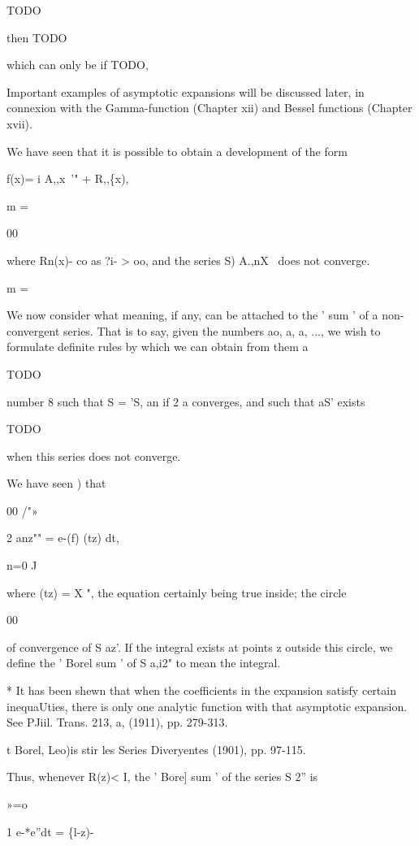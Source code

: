 TODO

then TODO

which can only be if TODO,

Important examples of asymptotic expansions will be discussed later,
in connexion with the Gamma-function (Chapter xii) and Bessel
functions (Chapter xvii).


We have seen that it is possible to obtain a development of the form

f(x)= i A,,x~'" + R,,\{x),

m =

00

where Rn(x)- co as ?i- > oo, and the series S) A.,nX~ does not
converge.

m =

We now consider what meaning, if any, can be attached to the ' sum '
of a non- convergent series. That is to say, given the numbers ao,
a, a, ..., we wish to formulate definite rules by which we can
obtain from them a

TODO

number 8 such that S = 'S, an if 2 a converges, and such that aS'
exists

TODO

when this series does not converge.

 We have seen ) that

00 /"»

2 anz"" = e-(f) (tz) dt,

n=0 J

where (tz) = X ", the equation certainly being true inside; the
circle

00

of convergence of S az'. If the integral exists at points z
outside this circle, we define the ' Borel sum ' of S a,i2" to mean
the integral.

* It has been shewn that when the coefficients in the expansion
satisfy certain inequaUties, there is only one analytic function with
that asymptotic expansion. See PJiil. Trans. 213, a, (1911), pp.
279-313.

t Borel, Leo)is stir les Series Diveryentes (1901), pp. 97-115.

%
%

Thus, whenever R(z)< I, the ' Bore] sum ' of the series S 2'' is

»=o

1 e-*e''dt = \{l-z)-\

